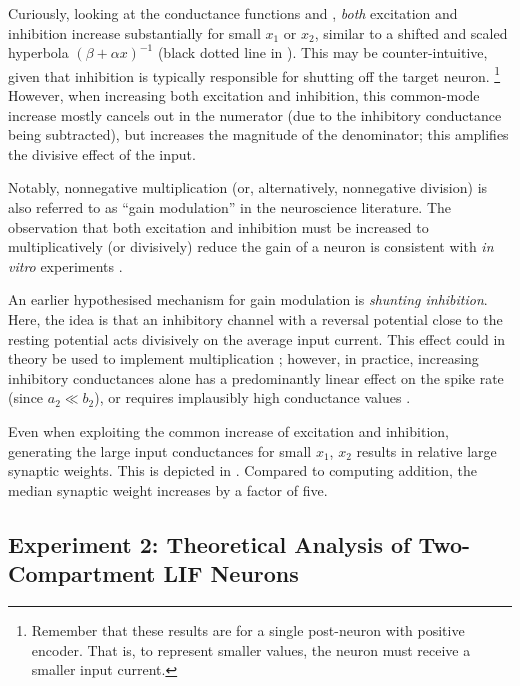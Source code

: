 Curiously, looking at the conductance functions \gE and \gI, \emph{both} excitation and inhibition increase substantially for small $x_1$ or $x_2$, similar to a shifted and scaled hyperbola  $(\beta + \alpha x)^{-1}$ (black dotted line in ).
This may be counter-intuitive, given that inhibition is typically responsible for shutting off the target neuron.%
\footnote{Remember that these results are for a single post-neuron with positive encoder. That is, to represent smaller values, the neuron must receive a smaller input current.}
However, when increasing both excitation and inhibition, this common-mode increase mostly cancels out in the numerator (due to the inhibitory conductance being subtracted), but increases the magnitude of the denominator; this amplifies the divisive effect of the input.

Notably, nonnegative multiplication (or, alternatively, nonnegative division) is also referred to as \enquote{gain modulation} in the neuroscience literature.
The observation that both excitation and inhibition must be increased to multiplicatively (or divisively) reduce the gain of a neuron is consistent with \emph{in vitro} experiments \citep{chance2002gain}.

An earlier hypothesised mechanism for gain modulation is \emph{shunting inhibition}.
Here, the idea is that an inhibitory channel with a reversal potential close to the resting potential acts divisively on the average input current.
This effect could in theory be used to implement multiplication \citep{koch1992multiplying}; however, in practice, increasing inhibitory conductances alone has a predominantly linear effect on the spike rate (since $a_2 \ll b_2$), or requires implausibly high conductance values \citep{holt1997shunting,abbott2005drivers}.

Even when exploiting the common increase of excitation and inhibition, generating the large input conductances for small $x_1$, $x_2$ results in relative large synaptic weights.
This is depicted in .
Compared to computing addition, the median synaptic weight increases by a factor of five.

\subsection{Experiment 2: Theoretical Analysis of Two-Compartment LIF Neurons}
\label{sec:two_comp_lif_experiment_2}

